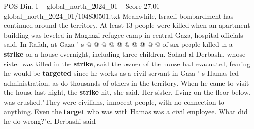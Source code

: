 \begin{textsample}{POS Dim 1 – global\_north\_2024\_01 – Score 27.00 – global\_north\_2024\_01/104830501.txt}
Meanwhile, Israeli bombardment has continued around the territory.
At least 13 people were killed when an apartment building was leveled in Maghazi refugee camp in central Gaza, hospital officials said.
In Rafah, at Gaza ' s @ @ @ @ @ @ @ @ @ @ of six people killed in a \textbf{strike} on a house overnight, including three children.
Sohad al-Derbashi, whose sister was killed in the \textbf{strike}, said the owner of the house had evacuated, fearing he would be \textbf{targeted} since he works as a civil servant in Gaza ' s Hamas-led administration, as do thousands of others in the territory.
When he came to visit the house last night, the \textbf{strike} hit, she said.
Her sister, living on the floor below, was crushed."They were civilians, innocent people, with no connection to anything.
Even the \textbf{target} who was with Hamas was a civil employee.
What did he do wrong?"el-Derbashi said.

\end{textsample}
